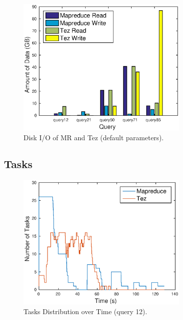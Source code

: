 \documentclass[10pt]{article}
\begin{document}
\begin{figure}
\begin{center}
\includegraphics[width=0.75\textwidth]{pic/q1b_disk}
\caption{Disk I/O of MR and Tez (default parameters).}
\label{fig:q1b_disk}
\end{center}
\end{figure}

\subsection{Tasks}

\begin{figure}
\begin{center}
\includegraphics[width=0.75\textwidth]{pic/q1c_task_distribution_12}
\caption{Tasks Distribution over Time (query 12).}
\label{fig:q1c_tasks_12}
\end{center}
\end{figure}
\end{document}
